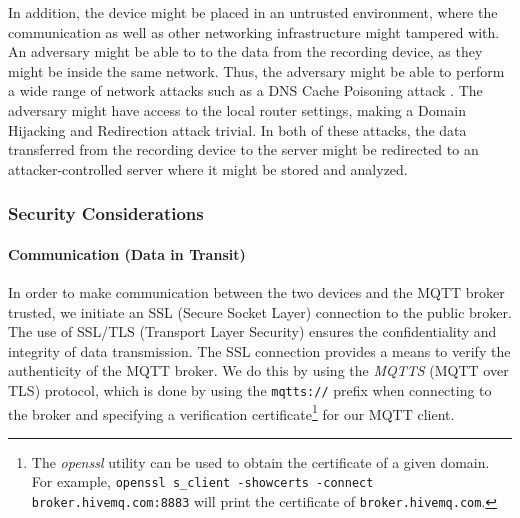 \documentclass[conference]{IEEEtran}
\begin{document}
In addition, the device might be placed in an untrusted environment, where the communication as well 
as other networking infrastructure might tampered with.
An adversary might be able to  to the data from the recording device,
as they might be inside the same network.
Thus, the adversary might be able to perform a wide range of network attacks such 
as a DNS Cache Poisoning attack \cite{Dissanayake_2018}.
The adversary might have access to the local router 
settings, making a Domain Hijacking and Redirection attack \cite{DnsHijacking} trivial. In both of these attacks, 
the data transferred from the recording device to the server might be redirected to an attacker-controlled server
where it might be stored and analyzed.

\subsubsection{Security Considerations}

\paragraph{Communication (Data in Transit)}

In order to make communication between the two devices and the MQTT broker
trusted, we initiate an SSL (Secure Socket Layer) connection to the public broker. 
The use of SSL/TLS (Transport Layer Security)
ensures the confidentiality and integrity of data transmission. 
The SSL connection provides a means
to verify the authenticity of the MQTT broker.
We do this by using the \textit{MQTTS} (MQTT over TLS) protocol, which is done 
by using the \texttt{mqtts://} prefix when connecting to the broker and specifying 
a verification certificate\footnote{The \textit{openssl} utility can be used to obtain the certificate of a given domain.
For example, \texttt{openssl s\_client -showcerts -connect broker.hivemq.com:8883} will print the certificate of \texttt{broker.hivemq.com}.}
for our MQTT client.
\end{document}
